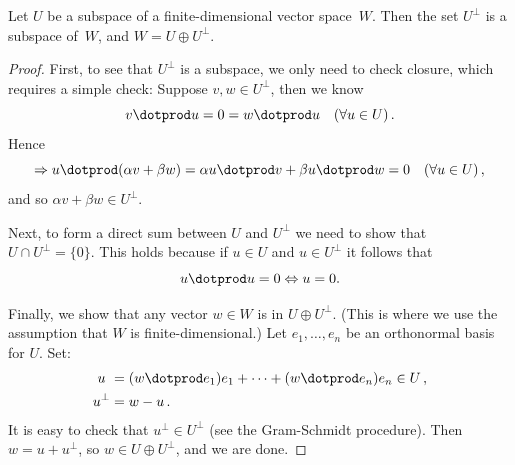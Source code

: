 \begin{theorem}
Let $U$ be a subspace of a finite-dimensional vector space~$W$.  Then the set $U^\perp$ is a subspace of~$W$, and $W=U\oplus U^\perp$.
\end{theorem}

\begin{proof}
First, to see that $U^\perp$ is a subspace, we only need to check closure, which requires a simple check:
Suppose $v,w\in U^\perp$, then we know  \[v\dotprod u = 0 = w\dotprod u \quad (\forall u\in U)\, .\]
Hence
\[\Rightarrow u\dotprod(\alpha v+\beta w)= \alpha u\dotprod v + \beta u\dotprod w =0\quad (\forall u\in U)\, ,\] 
and so $\alpha v+\beta w\in U^\perp$.

Next, to form a direct sum between $U$ and $U^\perp$ we need to show
that $U\cap U^\perp=\{0\}$. This holds because if $u\in U$ and $u\in U^\perp$ it follows that
\[
u\dotprod u = 0 \Leftrightarrow u=0.
\]

Finally, we show that any vector $w\in W$ is in $U\oplus U^\perp$.  (This is where we use the assumption that $W$ is finite-dimensional.)  Let $e_1, \ldots, e_n$ be an orthonormal basis for $U$.  Set: 
\begin{align*}
u\ &=(w\dotprod e_1)e_1 + \cdots + (w\dotprod e_n)e_n \in U\, ,\\
u^\perp&= w-u\, .
\end{align*}
It is easy to check that $u^\perp \in U^\perp$ (see the Gram-Schmidt procedure).  Then $w=u+u^\perp$, so $w\in U\oplus U^\perp$, and we are done.
\end{proof}


